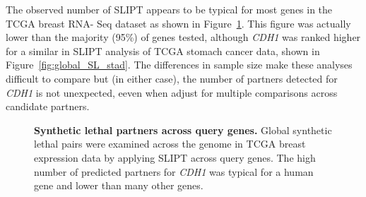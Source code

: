 The observed number of \gls{SLIPT} appears to be typical for most genes in the TCGA breast RNA- Seq dataset as shown in Figure~\ref{fig:global_SL}. This figure was actually lower than the majority (95\%) of genes tested, although \textit{CDH1} was ranked higher for a similar in \gls{SLIPT} analysis of TCGA stomach cancer data, shown in Figure~\ref{fig:global_SL_stad}. The differences in sample size make these analyses difficult to compare but (in either case), the number of partners detected for \textit{CDH1} is not unexpected, eeven when adjust for multiple comparisons across candidate partners.

\begin{figure}[!ht]
  \begin{center}
   \end{center}
   \caption[Synthetic lethal partners across query genes]{\small \textbf{Synthetic lethal partners across query genes.} Global synthetic lethal pairs were examined across the genome in TCGA breast expression data by applying \gls{SLIPT} across query genes. The high number of predicted partners for \textit{CDH1} was typical for a human gene and lower than many other genes.
   }
\label{fig:global_SL}
\end{figure}

